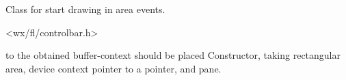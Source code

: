 %
%


\section{}\label{cbstartdrawinareaevent}


Class for start drawing in area events.




<wx/fl/controlbar.h>




\label{cbstartdrawinareaeventcbstartdrawinareaevent}


to the obtained buffer-context should be placed
Constructor, taking rectangular area, device context pointer to a pointer, and pane.

